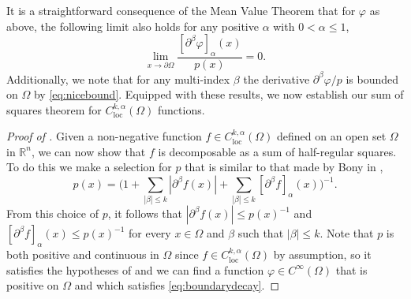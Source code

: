 \documentclass[oneside,hidelinks,indentfirst,10pt]{book}
\begin{document}
It is a straightforward consequence of the Mean Value Theorem that for \(\varphi\) as above, the following limit also holds for any positive \(\alpha\) with \(0<\alpha\leq 1\),
\begin{equation}\label{eq:alphadecay}
    \lim_{x\rightarrow\partial\Omega}\frac{[\partial^\beta \varphi]_\alpha(x)}{p(x)}=0.
\end{equation}
Additionally, we note that for any multi-index \(\beta\) the derivative \(\partial^\beta\varphi/p\) is bounded on \(\Omega\) by \eqref{eq:nicebound}. Equipped with these results, we now establish our sum of squares theorem for \(C_{\mathrm{loc}}^{k,\alpha}(\Omega)\) functions.


\begin{proof}[Proof of ]
Given a non-negative function \(f\in C^{k,\alpha}_{\mathrm{loc}}(\Omega)\) defined on an open set \(\Omega\) in \(\mathbb{R}^n\), we can now show that \(f\) is decomposable as a sum of half-regular squares. To do this we make a selection for \(p\) that is similar to that made by Bony in \cite{Bony},
\[
    p(x)=\bigg(1+\sum_{|\beta|\leq k}|\partial^\beta f(x)|+\sum_{|\beta|\leq k}[\partial^\beta f]_\alpha(x)\bigg)^{-1}.
\]
From this choice of \(p\), it follows that \(|\partial^\beta f(x)|\leq p(x)^{-1}\) and \([\partial^\beta f]_\alpha(x)\leq p(x)^{-1}\) for every \(x\in\Omega\) and \(\beta\) such that \(|\beta|\leq k\). Note that \(p\) is both positive and continuous in \(\Omega\) since \(f\in C^{k,\alpha}_{\mathrm{loc}}(\Omega)\) by assumption, so it satisfies the hypotheses of  and we can find a function \(\varphi\in C^\infty(\Omega)\) that is positive on \(\Omega\) and which satisfies \eqref{eq:boundarydecay}. 



\end{proof}
\end{document}
